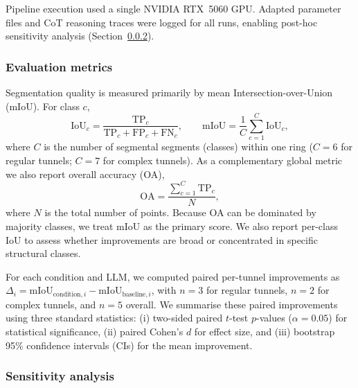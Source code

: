 \documentclass[a4paper,fleqn]{cas-dc}
\begin{document}
{Pipeline execution used a single NVIDIA RTX~5060 GPU. Adapted parameter files and CoT reasoning traces were logged for all runs, enabling post-hoc sensitivity analysis (Section~\ref{sec:sensitivity-method}).

\subsubsection{Evaluation metrics}\label{sec:metrics}

Segmentation quality is measured primarily by mean Intersection-over-Union (mIoU). For class $c$,
\begin{equation}
\text{IoU}_c = \frac{\text{TP}_c}{\text{TP}_c + \text{FP}_c + \text{FN}_c}, \qquad
\text{mIoU} = \frac{1}{C} \sum_{c=1}^{C} \text{IoU}_c,
\end{equation}
where $C$ is the number of segmental segments (classes) within one ring ($C=6$ for regular tunnels; $C=7$ for complex tunnels). As a complementary global metric we also report overall accuracy (OA),
\begin{equation}
\text{OA} = \frac{\sum_{c=1}^{C} \text{TP}_c}{N},
\end{equation}
where $N$ is the total number of points. Because OA can be dominated by majority classes, we treat mIoU as the primary score. We also report per-class IoU to assess whether improvements are broad or concentrated in specific structural classes.

For each condition and LLM, we computed paired per-tunnel improvements as $\Delta_i = \mathrm{mIoU}_{\text{condition},i} - \mathrm{mIoU}_{\text{baseline},i}$, with $n=3$ for regular tunnels, $n=2$ for complex tunnels, and $n=5$ overall. We summarise these paired improvements using three standard statistics: (i) two-sided paired $t$-test $p$-values ($\alpha = 0.05$) for statistical significance, (ii) paired Cohen's \mbox{$d$} for effect size, and (iii) bootstrap 95\% confidence intervals (CIs) for the mean improvement.

\subsubsection{Sensitivity analysis}\label{sec:sensitivity-method}

}
\end{document}

